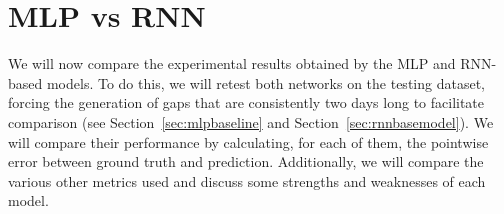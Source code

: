\section{MLP vs RNN}
We will now compare the experimental results obtained by the
MLP and RNN-based models.
To do this, we will retest both networks on the testing dataset,
forcing the generation of gaps that are consistently two days
long to facilitate comparison (see Section~\ref{sec:mlpbaseline}
and Section~\ref{sec:rnnbasemodel}).
We will compare their performance by calculating, for each of them,
the pointwise error between ground truth and prediction.
Additionally, we will compare the various other metrics used
and discuss some strengths and weaknesses of each model.



